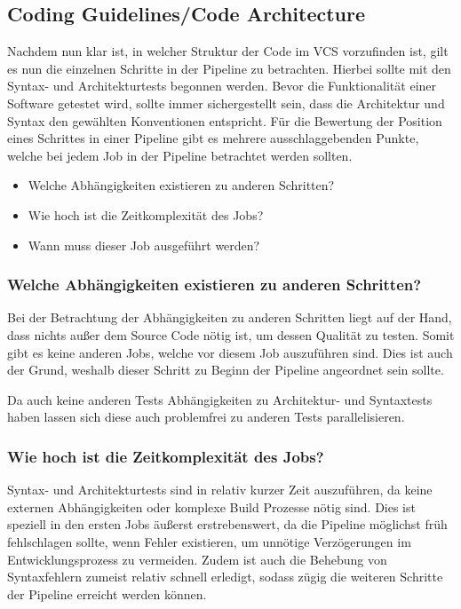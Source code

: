 \subsection{Coding Guidelines/Code Architecture}\label{subsec:codingGuidelines/codeArchitecture}

Nachdem nun klar ist, in welcher Struktur der Code im VCS vorzufinden ist, gilt es nun die einzelnen Schritte in der Pipeline zu betrachten.
Hierbei sollte mit den Syntax- und Architekturtests begonnen werden.
Bevor die Funktionalität einer Software getestet wird, sollte immer sichergestellt sein, dass die Architektur und Syntax den gewählten Konventionen entspricht.
Für die Bewertung der Position eines Schrittes in einer Pipeline gibt es mehrere ausschlaggebenden Punkte, welche bei jedem Job in der Pipeline betrachtet werden sollten.
\begin{itemize}
    \item Welche Abhängigkeiten existieren zu anderen Schritten?
    \item Wie hoch ist die Zeitkomplexität des Jobs?
    \item Wann muss dieser Job ausgeführt werden?
\end{itemize}

\subsubsection{Welche Abhängigkeiten existieren zu anderen Schritten?}

Bei der Betrachtung der Abhängigkeiten zu anderen Schritten liegt auf der Hand, dass nichts außer dem Source Code nötig ist, um dessen Qualität zu testen.
Somit gibt es keine anderen Jobs, welche vor diesem Job auszuführen sind.
Dies ist auch der Grund, weshalb dieser Schritt zu Beginn der Pipeline angeordnet sein sollte.

Da auch keine anderen Tests Abhängigkeiten zu Architektur- und Syntaxtests haben lassen sich diese auch problemfrei zu anderen Tests parallelisieren.

\subsubsection{Wie hoch ist die Zeitkomplexität des Jobs?}

Syntax- und Architekturtests sind in relativ kurzer Zeit auszuführen, da keine externen Abhängigkeiten oder komplexe Build Prozesse nötig sind.
Dies ist speziell in den ersten Jobs äußerst erstrebenswert, da die Pipeline möglichst früh fehlschlagen sollte, wenn Fehler existieren, um unnötige Verzögerungen im Entwicklungsprozess zu vermeiden.
Zudem ist auch die Behebung von Syntaxfehlern zumeist relativ schnell erledigt, sodass zügig die weiteren Schritte der Pipeline erreicht werden können.

